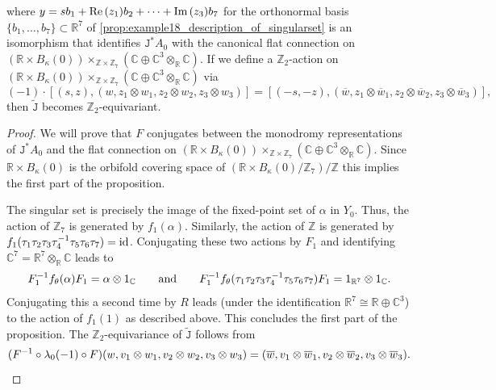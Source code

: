 \documentclass[11pt,a4paper]{scrartcl}
\newcommand{\id}{\textup{id}}
\newcommand{\im}{\textup{Im}\thinspace }
\newcommand{\re}{\textup{Re}\thinspace }
\numberwithin{equation}{section}
\theoremstyle{plain}
\theoremstyle{definition}
\theoremstyle{remark}
\begin{document}
\begin{proposition}
where $y = s b_1+ \re(z_1) b_2 + \dots + \im(z_3) b_7$ for the orthonormal basis $\{b_1,\dots,b_7\} \subset \mathbb{R}^7$ of \autoref{prop:example18_description_of_singularset} is an isomorphism that identifies $\mathtt{J}^*A_0$ with the canonical flat connection on $(\mathbb{R}\times B_\kappa(0)) \times_{\mathbb{Z}\times \mathbb{Z}_7} (\mathbb{C}\oplus \mathbb{C}^3 \otimes_\mathbb{R}\mathbb{C})$. If we define a $\mathbb{Z}_2$-action on $(\mathbb{R}\times B_\kappa(0)) \times_{\mathbb{Z}\times \mathbb{Z}_7} (\mathbb{C}\oplus \mathbb{C}^3 \otimes_\mathbb{R}\mathbb{C})$ via \[ (-1) \cdot [(s,z),(w,z_1\otimes w_1,z_2\otimes w_2,z_3 \otimes w_3)] = [(-s,-z),(\overline{w},z_1\otimes \overline{w}_1,z_2\otimes \overline{w}_2,z_3 \otimes \overline{w}_3)], \] then $\tilde{\mathtt{J}}$ becomes $\mathbb{Z}_2$-equivariant.
\end{proposition}

\begin{proof}
We will prove that $F$ conjugates between the monodromy representations of $\mathtt{J}^*A_0$ and the flat connection on $(\mathbb{R}\times B_\kappa(0)) \times_{\mathbb{Z}\times \mathbb{Z}_7} (\mathbb{C}\oplus \mathbb{C}^3 \otimes_\mathbb{R}\mathbb{C})$. Since $\mathbb{R}\times B_\kappa(0)$ is the orbifold covering space of $(\mathbb{R}\times B_\kappa(0)/\mathbb{Z}_7)/\mathbb{Z}$ this implies the first part of the proposition.

The singular set is precisely the image of the fixed-point set of $\alpha$ in $Y_0$. Thus, the action of $\mathbb{Z}_7$ is generated by $f_1(\alpha)$. Similarly, the action of $\mathbb{Z}$ is generated by $f_1(\tau_1\tau_2\tau_3\tau_4^{-1}\tau_5\tau_6\tau_7) = \id$. Conjugating these two actions by $F_1$ and identifying $\mathbb{C}^7= \mathbb{R}^7 \otimes_\mathbb{R}\mathbb{C}$ leads to \[ F_1^{-1} f_\theta(\alpha) F_1 = \alpha \otimes 1_\mathbb{C} \qquad \textup{and} \qquad F_1^{-1} f_\theta(\tau_1\tau_2\tau_3\tau_4^{-1}\tau_5\tau_6\tau_7) F_1 = 1_{\mathbb{R}^7} \otimes 1_\mathbb{C}. \] Conjugating this a second time by $R$ leads (under the identification $\mathbb{R}^7 \cong \mathbb{R}\oplus \mathbb{C}^3$) to the action of $f_1(1)$ as described above. This concludes the first part of the proposition. The $\mathbb{Z}_2$-equivariance of $\tilde{\mathtt{J}}$ follows from \[(F^{-1}\circ \lambda_0(-1) \circ F)(w,v_1\otimes w_1, v_2 \otimes w_2, v_3 \otimes w_3) = (\overline{w},v_1\otimes \overline{w}_1, v_2 \otimes \overline{w}_2, v_3 \otimes \overline{w}_3). \qedhere\]
\end{proof}
\end{document}

